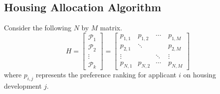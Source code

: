 \documentclass[11pt]{article}
\begin{document}
\subsection{Housing Allocation Algorithm}
Consider the following $N$ by $M$ matrix. 
\[H =
\begin{bmatrix}
    \mathcal{P}_1 \\
    \mathcal{P}_2 \\
    \vdots \\
    \mathcal{P}_k
\end{bmatrix}
=
\begin{bmatrix}
    p_{1,1} & p_{1,2} & \cdots & p_{1,M} \\
    p_{2,1} & \ddots & \quad & p_{2,M} \\
    \vdots & \quad & \ddots & \vdots \\
    p_{N,1} & p_{N,2} & \cdots & p_{N,M} 
\end{bmatrix}\]
where $p_{i,j}$ represents the preference ranking for applicant $i$ on housing development $j$. \\
\newline
\end{document}
